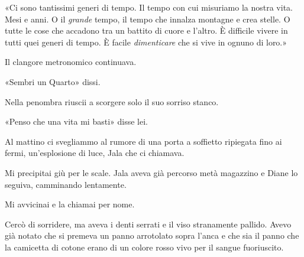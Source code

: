 «Ci sono tantissimi generi di tempo. Il tempo con cui misuriamo la
nostra vita. Mesi e anni. O il \emph{grande} tempo, il tempo che innalza
montagne e crea stelle. O tutte le cose che accadono tra un battito di
cuore e l'altro. È difficile vivere in tutti quei generi di tempo. È
facile \emph{dimenticare} che si vive in ognuno di loro.»

Il clangore metronomico continuava.

«Sembri un Quarto» dissi.

Nella penombra riuscii a scorgere solo il suo sorriso stanco.

«Penso che una vita mi basti» disse lei.

\separatorefiori

Al mattino ci svegliammo al rumore di una porta a soffietto ripiegata
fino ai fermi, un'esplosione di luce, Jala che ci chiamava.

Mi precipitai giù per le scale. Jala aveva già percorso metà magazzino e
Diane lo seguiva, camminando lentamente.

Mi avvicinai e la chiamai per nome.

Cercò di sorridere, ma aveva i denti serrati e il viso stranamente
pallido. Avevo già notato che si premeva un panno arrotolato sopra
l'anca e che sia il panno che la camicetta di cotone erano di un colore
rosso vivo per il sangue fuoriuscito.